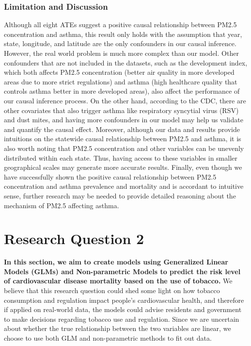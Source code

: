 \documentclass{article}
\begin{document}
 \subsubsection{Limitation and Discussion}
Although all eight ATEs suggest a positive causal relationship between PM2.5 concentration and asthma, this result only holds with the assumption that year, state, longitude, and latitude are the only confounders in our causal inference. However, the real world problem is much more complex than our model. Other confounders that are not included in the datasets, such as the development index, which both affects PM2.5 concentration (better air quality in more developed areas due to more strict regulations) and asthma (high healthcare quality that controls asthma better in more developed areas), also affect the performance of our causal inference process. On the other hand, according to the CDC, there are other covariates that also trigger asthma like respiratory syncytial virus (RSV) and dust mites, and having more confounders in our model may help us validate and quantify the causal effect. Moreover, although our data and results provide intuitions on the statewide causal relationship between PM2.5 and asthma, it is also worth noting that PM2.5 concentration and other variables can be unevenly distributed within each state. Thus, having access to these variables in smaller geographical scales may generate more accurate results. Finally, even though we have successfully shown the positive causal relationship between PM2.5 concentration and asthma prevalence and mortality and is accordant to intuitive sense, further research may be needed to provide detailed reasoning about the mechanism of PM2.5 affecting asthma. 



\section{Research Question 2}
\textbf{In this section, we aim to create models using Generalized Linear Models (GLMs) and Non-parametric Models to predict the risk level of cardiovascular disease mortality based on the use of tobacco.} We believe that this research question could shed some light on how tobacco consumption and regulation impact people's cardiovascular health, and therefore if applied on real-world data, the models could advise residents and government to make decisions regarding tobacco use and regulation. Since we are uncertain about whether the true relationship between the two variables are linear, we choose to use both GLM and non-parametric methods to fit out data. 
\end{document}
